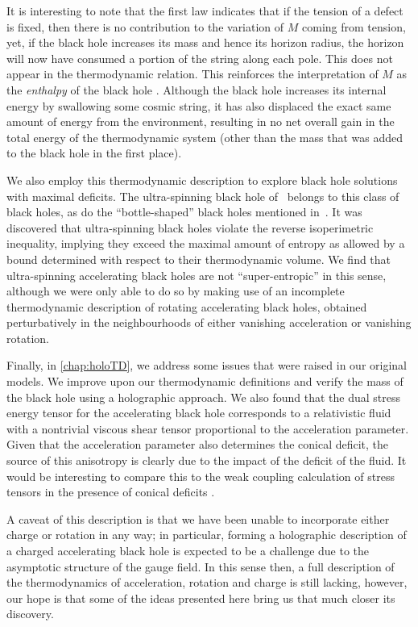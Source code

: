 \documentclass[
twoside,
openright,
frontopenright,
]{dmathesis}
\begin{document}
It is interesting to note that the first law indicates that if the tension of a
defect is fixed, then there is no contribution to the variation of $M$ coming
from tension, yet, if the black hole increases its mass and hence its horizon
radius, the horizon will now have consumed a portion of the string along each
pole.  This does not appear in the thermodynamic relation. This reinforces the
interpretation of $M$ as the {\it enthalpy} of the black hole
\cite{Kastor:2009wy}.  Although the black hole increases its internal energy by
swallowing some cosmic string, it has also displaced the exact same amount of
energy from the environment, resulting in no net overall gain in the total
energy of the thermodynamic system (other than the mass that was added to the
black hole in the first place).

We also employ this thermodynamic description to explore black hole solutions
with maximal deficits. The ultra-spinning black hole
of~\cite{Klemm:2014rda,Gnecchi:2013mja,Hennigar:2014cfa} belongs to this class
of black holes, as do the ``bottle-shaped'' black holes mentioned
in~\cite{Hubeny:2009kz,Chen:2016rjt}. It was discovered that ultra-spinning
black holes violate the reverse isoperimetric inequality, implying they exceed
the maximal amount of entropy as allowed by a bound determined with respect to
their thermodynamic volume. We find that ultra-spinning accelerating black holes
are not ``super-entropic'' in this sense, although we were only able to do so by
making use of an incomplete
thermodynamic description of rotating accelerating black holes, obtained
perturbatively in the neighbourhoods of either vanishing acceleration or
vanishing rotation.

Finally, in \cref{chap:holoTD}, we address some issues that were raised in our
original models. We improve upon our thermodynamic definitions and verify the
mass of the black hole using a holographic approach. We also found that the dual
stress energy tensor for the accelerating black hole corresponds to a
relativistic fluid with a nontrivial viscous shear tensor proportional to the
acceleration parameter. Given that the acceleration parameter also determines
the conical deficit, the source of this anisotropy is clearly due to the impact
of the deficit of the fluid. It would be interesting to compare this to the weak
coupling calculation of stress tensors in the presence of conical deficits
\cite{Dowker:1977zj}.

A caveat of this description is that we have been unable to incorporate either
charge or rotation in any way; in particular, forming a holographic description
of a charged accelerating black hole is expected to be a challenge due to the
asymptotic structure of the gauge field. In this sense then, a full description of
the thermodynamics of acceleration, rotation and charge is still lacking,
however, our hope is that some of the ideas presented here bring us that much
closer its discovery.


%
%


{}


\end{document}
